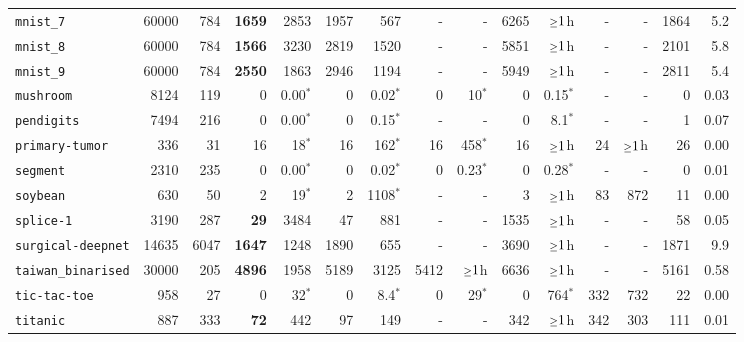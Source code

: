 \begin{tabular}{lccrrrrrrrrrrrr}
\texttt{mnist\_7} & \multicolumn{1}{r}{60000} & \multicolumn{1}{r}{784}  & \textbf{1659} & 2853 & 1957 & 567 & - & - & 6265 & $\mathsmaller{\geq}1$h & - & - & 1864 & 5.2\\
\texttt{mnist\_8} & \multicolumn{1}{r}{60000} & \multicolumn{1}{r}{784}  & \textbf{1566} & 3230 & 2819 & 1520 & - & - & 5851 & $\mathsmaller{\geq}1$h & - & - & 2101 & 5.8\\
\texttt{mnist\_9} & \multicolumn{1}{r}{60000} & \multicolumn{1}{r}{784}  & \textbf{2550} & 1863 & 2946 & 1194 & - & - & 5949 & $\mathsmaller{\geq}1$h & - & - & 2811 & 5.4\\
\texttt{mushroom} & \multicolumn{1}{r}{8124} & \multicolumn{1}{r}{119}  & 0 & 0.00$^*$ & 0 & 0.02$^*$ & 0 & 10$^*$ & 0 & 0.15$^*$ & - & - & 0 & 0.03\\
\texttt{pendigits} & \multicolumn{1}{r}{7494} & \multicolumn{1}{r}{216}  & 0 & 0.00$^*$ & 0 & 0.15$^*$ & - & - & 0 & 8.1$^*$ & - & - & 1 & 0.07\\
\texttt{primary-tumor} & \multicolumn{1}{r}{336} & \multicolumn{1}{r}{31}  & 16 & 18$^*$ & 16 & 162$^*$ & 16 & 458$^*$ & 16 & $\mathsmaller{\geq}1$h & 24 & $\mathsmaller{\geq}1$h & 26 & 0.00\\
\texttt{segment} & \multicolumn{1}{r}{2310} & \multicolumn{1}{r}{235}  & 0 & 0.00$^*$ & 0 & 0.02$^*$ & 0 & 0.23$^*$ & 0 & 0.28$^*$ & - & - & 0 & 0.01\\
\texttt{soybean} & \multicolumn{1}{r}{630} & \multicolumn{1}{r}{50}  & 2 & 19$^*$ & 2 & 1108$^*$ & - & - & 3 & $\mathsmaller{\geq}1$h & 83 & 872 & 11 & 0.00\\
\texttt{splice-1} & \multicolumn{1}{r}{3190} & \multicolumn{1}{r}{287}  & \textbf{29} & 3484 & 47 & 881 & - & - & 1535 & $\mathsmaller{\geq}1$h & - & - & 58 & 0.05\\
\texttt{surgical-deepnet} & \multicolumn{1}{r}{14635} & \multicolumn{1}{r}{6047}  & \textbf{1647} & 1248 & 1890 & 655 & - & - & 3690 & $\mathsmaller{\geq}1$h & - & - & 1871 & 9.9\\
\texttt{taiwan\_binarised} & \multicolumn{1}{r}{30000} & \multicolumn{1}{r}{205}  & \textbf{4896} & 1958 & 5189 & 3125 & 5412 & $\mathsmaller{\geq}1$h & 6636 & $\mathsmaller{\geq}1$h & - & - & 5161 & 0.58\\
\texttt{tic-tac-toe} & \multicolumn{1}{r}{958} & \multicolumn{1}{r}{27}  & 0 & 32$^*$ & 0 & 8.4$^*$ & 0 & 29$^*$ & 0 & 764$^*$ & 332 & 732 & 22 & 0.00\\
\texttt{titanic} & \multicolumn{1}{r}{887} & \multicolumn{1}{r}{333}  & \textbf{72} & 442 & 97 & 149 & - & - & 342 & $\mathsmaller{\geq}1$h & 342 & 303 & 111 & 0.01\\

\end{tabular}
